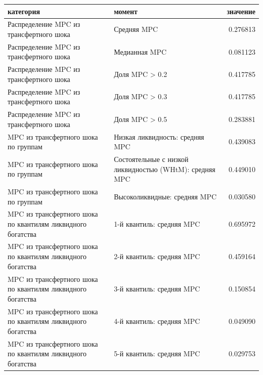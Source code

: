\begin{tabular}{llr}
\toprule
категория & момент & значение \\
\midrule
Распределение MPC из трансфертного шока & Средняя MPC & 0.276813 \\
Распределение MPC из трансфертного шока & Медианная MPC & 0.081123 \\
Распределение MPC из трансфертного шока & Доля MPC > 0.2 & 0.417785 \\
Распределение MPC из трансфертного шока & Доля MPC > 0.3 & 0.417785 \\
Распределение MPC из трансфертного шока & Доля MPC > 0.5 & 0.283881 \\
MPC из трансфертного шока по группам & Низкая ликвидность: средняя MPC & 0.439083 \\
MPC из трансфертного шока по группам & Состоятельные с низкой ликвидностью (WHtM): средняя MPC & 0.449010 \\
MPC из трансфертного шока по группам & Высоколиквидные: средняя MPC & 0.030580 \\
MPC из трансфертного шока по квантилям ликвидного богатства & 1-й квантиль: средняя MPC & 0.695972 \\
MPC из трансфертного шока по квантилям ликвидного богатства & 2-й квантиль: средняя MPC & 0.459164 \\
MPC из трансфертного шока по квантилям ликвидного богатства & 3-й квантиль: средняя MPC & 0.150854 \\
MPC из трансфертного шока по квантилям ликвидного богатства & 4-й квантиль: средняя MPC & 0.049090 \\
MPC из трансфертного шока по квантилям ликвидного богатства & 5-й квантиль: средняя MPC & 0.029753 \\
\bottomrule
\end{tabular}
